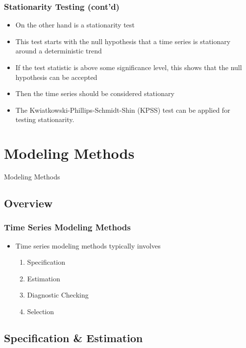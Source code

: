 \documentclass[presentation]{beamer}
\begin{document}
\begin{frame}[t]
\frametitle{Stationarity Testing (cont'd)}
\footnotesize{
\begin{itemize}
\item{On the other hand is a stationarity test}
\item{This test starts with the null hypothesis that a time series is stationary around a deterministic trend}
\item{If the test statistic is above some significance level, this shows that the null hypothesis can be accepted}
\item{Then the time series should be considered stationary}
\item{The Kwiatkowski-Phillips-Schmidt-Shin (KPSS) test can be applied for testing stationarity.}
\end{itemize}
}
\end{frame}

\section{Modeling Methods}

\begin{frame}
\begin{center}
\Large{Modeling Methods}
\end{center}
\end{frame}

\subsection{Overview}

\begin{frame}[t]
\frametitle{Time Series Modeling Methods}
\begin{itemize}
\item{Time series modeling methods typically involves
  \begin{enumerate}
  \item{Specification}
  \item{Estimation}
  \item{Diagnostic Checking}
  \item{Selection}
  \end{enumerate}}
\end{itemize}
\end{frame}

\subsection{Specification \& Estimation}
\end{document}
